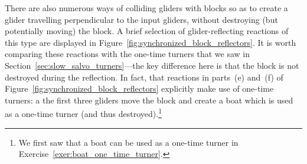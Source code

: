 There are also numerous ways of colliding gliders with blocks so as to create a glider travelling perpendicular to the input gliders, without destroying (but potentially moving) the block. A brief selection of glider-reflecting reactions of this type are displayed in Figure~\ref{fig:synchronized_block_reflectors}. It is worth comparing these reactions with the one-time turners that we saw in Section~\ref{sec:slow_salvo_turners}---the key difference here is that the block is not destroyed during the reflection. In fact, that reactions in parts~(e) and~(f) of Figure~\ref{fig:synchronized_block_reflectors} explicitly make use of one-time turners: a the first three gliders move the block and create a boat which is used as a one-time turner (and thus destroyed).\footnote{We first saw that a boat can be used as a one-time turner in Exercise~\ref{exer:boat_one_time_turner}.}

